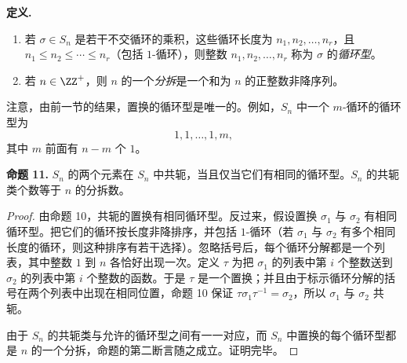 \noindent\textbf{定义.}
\begin{enumerate}[label=(\arabic*)]
  \item 若 $\sigma\in S_n$ 是若干不交循环的乘积，这些循环长度为 $n_1,n_2,\ldots,n_r$，且 $n_1\leq n_2\leq\cdots\leq n_r$（包括 $1$-循环），则整数 $n_1,n_2,\ldots,n_r$ 称为 $\sigma$ 的\emph{循环型}。
  \item 若 $n\in\ZZ^+$，则 $n$ 的一个\emph{分拆}是一个和为 $n$ 的正整数非降序列。
\end{enumerate}

注意，由前一节的结果，置换的循环型是唯一的。例如，$S_n$ 中一个 $m$-循环的循环型为
\[
  1,1,\ldots,1,m,
\]
其中 $m$ 前面有 $n-m$ 个 $1$。

\medskip
\noindent\textbf{命题 11.} $S_n$ 的两个元素在 $S_n$ 中共轭，当且仅当它们有相同的循环型。$S_n$ 的共轭类个数等于 $n$ 的分拆数。

\begin{proof}
由命题 10，共轭的置换有相同循环型。反过来，假设置换 $\sigma_1$ 与 $\sigma_2$ 有相同循环型。把它们的循环按长度非降排序，并包括 $1$-循环（若 $\sigma_1$ 与 $\sigma_2$ 有多个相同长度的循环，则这种排序有若干选择）。忽略括号后，每个循环分解都是一个列表，其中整数 $1$ 到 $n$ 各恰好出现一次。定义 $\tau$ 为把 $\sigma_1$ 的列表中第 $i$ 个整数送到 $\sigma_2$ 的列表中第 $i$ 个整数的函数。于是 $\tau$ 是一个置换；并且由于标示循环分解的括号在两个列表中出现在相同位置，命题 10 保证 $\tau\sigma_1\tau^{-1}=\sigma_2$，所以 $\sigma_1$ 与 $\sigma_2$ 共轭。

由于 $S_n$ 的共轭类与允许的循环型之间有一一对应，而 $S_n$ 中置换的每个循环型都是 $n$ 的一个分拆，命题的第二断言随之成立。证明完毕。
\end{proof}


